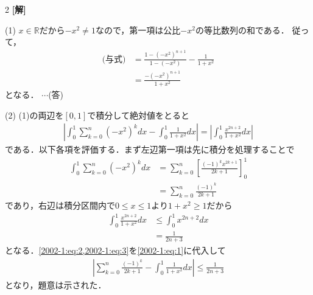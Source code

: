 \documentclass[../../main.tex]{subfiles}
\begin{document}
\setcounter{equation}{0}
\setcounter{figure}{0}
\setcounter{table}{0}
\begin{oframed}
  
\end{oframed}
\setlength{\columnseprule}{0.4pt}
\begin{multicols}{2}
  {\bf[解]}

  (1)
  $x \in \mathbb{R}$だから$-x^2 \neq 1$なので，第一項は公比$-x^2$の等比数列の和である．
  従って，
  \begin{align*}
    \text{(与式)}
     & = \frac{1-(-x^2)^{n+1}}{1-(-x^2)} - \frac{1}{1+x^2} \\
     & = \frac{-(-x^2)^{n+1}}{1+x^2}
  \end{align*}
  となる． $\cdots$(答)

  \vspace{10pt}
  (2)
  (1)の両辺を$[0,1]$で積分して絶対値をとると
  \begin{align}
    \left| \int_0^1 \sum_{k=0}^n (-x^2)^k dx - \int_0^1 \frac{1}{1+x^2} dx \right|
    = \left| \int_0^1 \frac{x^{2n+2}}{1+x^2} dx \right| \label{2002-1:eq:1}
  \end{align}
  である．以下各項を評価する．まず左辺第一項は先に積分を処理することで
  \begin{align}
    \int_0^1 \sum_{k=0}^n (-x^2)^k dx
     & = \sum_{k=0}^n \left[ \frac{(-1)^k x^{2k+1}}{2k+1} \right]_0^1 \nonumber \\
     & = \sum_{k=0}^n \frac{(-1)^k}{2k+1} \label{2002-1:eq:2}
  \end{align}
  であり，右辺は積分区間内で$0\le x\le 1$より$1+x^2\ge 1$だから
  \begin{align}
    \int_0^1 \frac{x^{2n+2}}{1+x^2} dx
     & \le \int_0^1 x^{2n+2} dx      \nonumber \\
     & = \frac{1}{2n+3} \label{2002-1:eq:3}
  \end{align}
  となる．\cref{2002-1:eq:2,2002-1:eq:3}を\cref{2002-1:eq:1}に代入して
  \begin{align}
    \left| \sum_{k=0}^n \frac{(-1)^k}{2k+1} - \int_0^1 \frac{1}{1+x^2} dx \right| \le \frac{1}{2n+3} \label{2002-1:eq:4}
  \end{align}
  となり，題意は示された．


\end{multicols}
\end{document}
